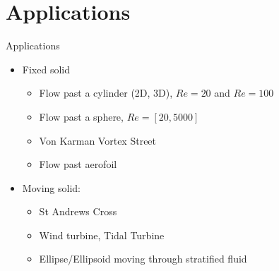 \documentclass[	%
	bigger, %
	hyperref, %
	xcolor,	%
	t,		%
]{beamer}
\begin{document}
\section{Applications}
\begin{frame}{Applications}
 \begin{itemize}
  \item Fixed solid
  \begin{itemize}
    \item Flow past a cylinder (2D, 3D), $Re=20$ and $Re=100$
    \item Flow past a sphere, $Re=[20,5000]$
    \item Von Karman Vortex Street
    \item Flow past aerofoil
  \end{itemize}
  \pause
  \item Moving solid:
  \begin{itemize}
    \item St Andrews Cross
    \item Wind turbine, Tidal Turbine
    \item Ellipse/Ellipsoid moving through stratified fluid
  \end{itemize}
 \end{itemize}
\end{frame}
\end{document}
